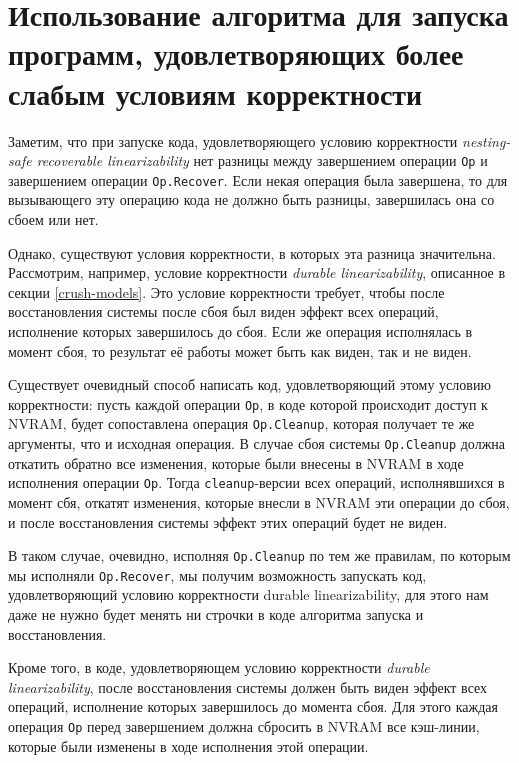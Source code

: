 \documentclass[times,specification,annotation]{itmo-student-thesis}
\begin{document}
\section{Использование алгоритма для запуска программ, удовлетворяющих более слабым условиям корректности}

Заметим, что при запуске кода, удовлетворяющего условию корректности \emph{nesting-safe recoverable linearizability} нет разницы между завершением операции \texttt{Op} и завершением операции \texttt{Op.Recover}. Если некая операция была завершена, то для вызывающего эту операцию кода не должно быть разницы, завершилась она со сбоем или нет.

Однако, существуют условия корректности, в которых эта разница значительна. Рассмотрим, например, условие корректности \emph{durable linearizability}, описанное в секции \ref{crush-models}. Это условие корректности требует, чтобы после восстановления системы после сбоя был виден эффект всех операций, исполнение которых завершилось до сбоя. Если же операция исполнялась в момент сбоя, то результат её работы может быть как виден, так и не виден.

Существует очевидный способ написать код, удовлетворяющий этому условию корректности: пусть каждой операции \texttt{Op}, в коде которой происходит доступ к NVRAM, будет сопоставлена операция \texttt{Op.Cleanup}, которая получает те же аргументы, что и исходная операция. В случае сбоя системы \texttt{Op.Cleanup} должна откатить обратно все изменения, которые были внесены в NVRAM в ходе исполнения операции \texttt{Op}. Тогда \texttt{cleanup}-версии всех операций, исполнявшихся в момент сбя, откатят изменения, которые внесли в NVRAM эти операции до сбоя, и после восстановления системы эффект этих операций будет не виден.

В таком случае, очевидно, исполняя \texttt{Op.Cleanup} по тем же правилам, по которым мы исполняли \texttt{Op.Recover}, мы получим возможность запускать код, удовлетворяющий условию корректности durable linearizability, для этого нам даже не нужно будет менять ни строчки в коде алгоритма запуска и восстановления.

Кроме того, в коде, удовлетворяющем условию корректности \emph{durable linearizability}, после восстановления системы должен быть виден эффект всех операций, исполнение которых завершилось до момента сбоя. Для этого каждая операция \texttt{Op} перед завершением должна сбросить в NVRAM все кэш-линии, которые были изменены в ходе исполнения этой операции.
\end{document}
